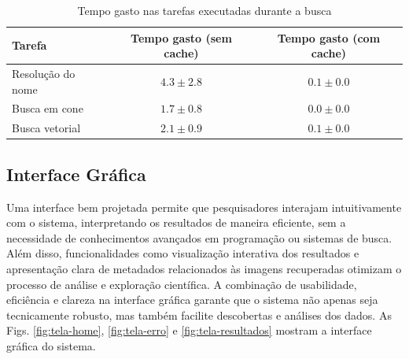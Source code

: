 
\begin{table}[!ht]
  \centering
  \caption{Tempo gasto nas tarefas executadas durante a busca}
  \label{tab:times}
  \begin{tabular}{lcc}
    \toprule
    Tarefa            & Tempo gasto (sem cache) & Tempo gasto (com cache) \\
    \midrule
    Resolução do nome & $4.3 \pm 2.8$           & $0.1 \pm 0.0$           \\
    Busca em cone     & $1.7 \pm 0.8$           & $0.0 \pm 0.0$           \\
    Busca vetorial    & $2.1 \pm 0.9$           & $0.1 \pm 0.0$           \\
    \bottomrule
  \end{tabular}
\end{table}



\subsection{Interface Gráfica}
\label{sec:sist-ui}

Uma interface bem projetada permite que pesquisadores interajam intuitivamente com o sistema, interpretando os resultados de maneira eficiente, sem a necessidade de conhecimentos avançados em programação ou sistemas de busca. Além disso, funcionalidades como visualização interativa dos resultados e apresentação clara de metadados relacionados às imagens recuperadas otimizam o processo de análise e exploração científica. A combinação de usabilidade, eficiência e clareza na interface gráfica garante que o sistema não apenas seja tecnicamente robusto, mas também facilite descobertas e análises dos dados. As Figs. \ref{fig:tela-home}, \ref{fig:tela-erro} e \ref{fig:tela-resultados} mostram a interface gráfica do sistema.

